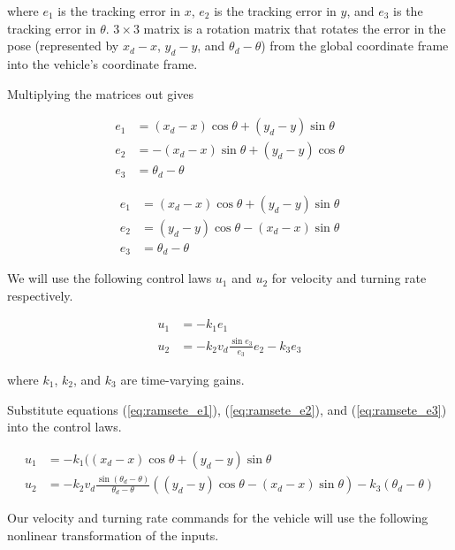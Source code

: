 where $e_1$ is the tracking \gls{error} in $x$, $e_2$ is the tracking
\gls{error} in $y$, and $e_3$ is the tracking \gls{error} in $\theta$.
$3 \times 3$ matrix is a rotation matrix that rotates the \gls{error} in the
\gls{pose} (represented by $x_d - x$, $y_d - y$, and $\theta_d - \theta$) from
the global coordinate frame into the vehicle's coordinate frame.

Multiplying the matrices out gives

\begin{align*}
  e_1 &= (x_d - x) \cos\theta + (y_d - y) \sin\theta \\
  e_2 &= -(x_d - x) \sin\theta + (y_d - y) \cos\theta \\
  e_3 &= \theta_d - \theta
\end{align*}

\begin{align}
  e_1 &= (x_d - x) \cos\theta + (y_d - y) \sin\theta \label{eq:ramsete_e1} \\
  e_2 &= (y_d - y) \cos\theta - (x_d - x) \sin\theta \label{eq:ramsete_e2} \\
  e_3 &= \theta_d - \theta \label{eq:ramsete_e3}
\end{align}

We will use the following control laws $u_1$ and $u_2$ for velocity and turning
rate respectively.

\begin{equation}
  \begin{aligned}
    u_1 &= -k_1 e_1 \\
    u_2 &= -k_2 v_d \frac{\sin{e_3}}{e_3} e_2 - k_3 e_3
  \end{aligned}
  \label{eq:ramsete_u}
\end{equation}

where $k_1$, $k_2$, and $k_3$ are time-varying gains.

Substitute equations (\ref{eq:ramsete_e1}), (\ref{eq:ramsete_e2}), and
(\ref{eq:ramsete_e3}) into the control laws.

\begin{align*}
  u_1 &= -k_1 ((x_d - x) \cos\theta + (y_d - y) \sin\theta \\
  u_2 &= -k_2 v_d \frac{\sin(\theta_d - \theta)}{\theta_d - \theta}
    ((y_d - y) \cos\theta - (x_d - x) \sin\theta) - k_3 (\theta_d - \theta)
\end{align*}

Our velocity and turning rate commands for the vehicle will use the following
nonlinear transformation of the inputs.

